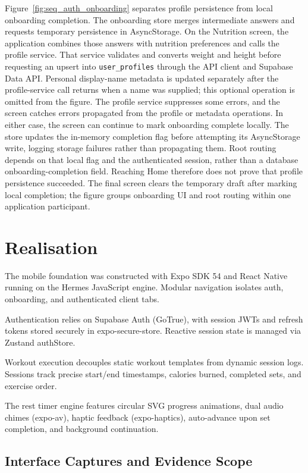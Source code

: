 \documentclass[12pt,a4paper,openany]{report}
\begin{document}
Figure~\ref{fig:seq_auth_onboarding} separates profile persistence from local onboarding completion. The onboarding store merges intermediate answers and requests temporary persistence in AsyncStorage. On the Nutrition screen, the application combines those answers with nutrition preferences and calls the profile service. That service validates and converts weight and height before requesting an upsert into \texttt{user\_profiles} through the API client and Supabase Data API. Personal display-name metadata is updated separately after the profile-service call returns when a name was supplied; this optional operation is omitted from the figure. The profile service suppresses some errors, and the screen catches errors propagated from the profile or metadata operations. In either case, the screen can continue to mark onboarding complete locally. The store updates the in-memory completion flag before attempting its AsyncStorage write, logging storage failures rather than propagating them. Root routing depends on that local flag and the authenticated session, rather than a database onboarding-completion field. Reaching Home therefore does not prove that profile persistence succeeded. The final screen clears the temporary draft after marking local completion; the figure groups onboarding UI and root routing within one application participant.


\section{Realisation}

The mobile foundation was constructed with Expo SDK 54 and React Native running on the Hermes JavaScript engine. Modular navigation isolates auth, onboarding, and authenticated client tabs.


Authentication relies on Supabase Auth (GoTrue), with session JWTs and refresh tokens stored securely in expo-secure-store. Reactive session state is managed via Zustand authStore.


Workout execution decouples static workout templates from dynamic session logs. Sessions track precise start/end timestamps, calories burned, completed sets, and exercise order.


The rest timer engine features circular SVG progress animations, dual audio chimes (expo-av), haptic feedback (expo-haptics), auto-advance upon set completion, and background continuation.


\subsection{Interface Captures and Evidence Scope}
\end{document}
